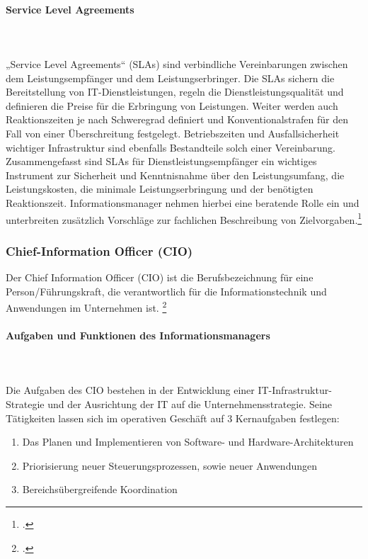 \paragraph{Service Level Agreements}\mbox{}\\\\
„Service Level Agreements“ (SLAs) sind verbindliche Vereinbarungen zwischen dem Leistungsempfänger und dem Leistungserbringer. Die SLAs sichern die Bereitstellung von IT-Dienstleistungen, regeln die Dienstleistungsqualität und definieren die Preise für die Erbringung von Leistungen. Weiter werden auch Reaktionszeiten je nach Schweregrad definiert und Konventionalstrafen für den Fall von einer Überschreitung festgelegt. Betriebszeiten und Ausfallsicherheit wichtiger Infrastruktur sind ebenfalls Bestandteile solch einer Vereinbarung.
Zusammengefasst sind SLAs für Dienstleistungsempfänger ein wichtiges Instrument zur Sicherheit und Kenntnisnahme über den Leistungsumfang, die Leistungskosten, die minimale Leistungserbringung und der benötigten Reaktionszeit. Informationsmanager nehmen hierbei eine beratende Rolle ein und unterbreiten zusätzlich Vorschläge zur fachlichen Beschreibung von Zielvorgaben.\footcite{Zitat fehlt}


\subsubsection{Chief-Information Officer (CIO)}
Der Chief Information Officer (CIO) ist die Berufsbezeichnung für eine Person/Führungskraft, die verantwortlich für die Informationstechnik und Anwendungen im Unternehmen ist. \footcite{Zitat fehlt}


\paragraph{Aufgaben und Funktionen des Informationsmanagers}\mbox{}\\\\
\label{aufgaben_funktionen_inm}
Die Aufgaben des CIO bestehen in der Entwicklung einer IT-Infrastruktur-Strategie und der Ausrichtung der IT auf die Unternehmensstrategie. Seine Tätigkeiten lassen sich im operativen Geschäft auf 3 Kernaufgaben festlegen: 
\begin{enumerate}
    \item Das Planen und Implementieren von Software- und Hardware-Architekturen 
    \item Priorisierung neuer Steuerungsprozessen, sowie neuer Anwendungen
    \item Bereichsübergreifende Koordination
\end{enumerate}


